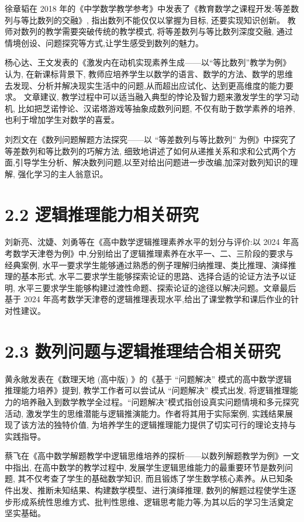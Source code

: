 \documentclass[10pt]{article}
\begin{document}
徐章韬在 2018 年的《中学数学教学参考》中发表了《教育数学之课程开发:等差数列与等比数列的交融》, 指出数列不能仅仅以掌握为目标, 还要实现知识创新。 教师对数列的教学需要突破传统的教学模式, 将等差数列与等比数列深度交融, 通过情境创设、问题探究等方式,让学生感受到数列的魅力。

杨心达、王文发表的《激发内在动机实现素养生成——以“等比数列”教学为例》 认为, 在新课标背景下, 教师应培养学生以数学的语言、数学的方法、数学的思维去发现、分析并解决现实生活中的问题,从而超出应试化、达到更高维度的能力要求。 文章建议, 教学过程中可以适当融入典型的悖论及智力题来激发学生的学习动机, 比如把芝诺悖论、汉诺塔游戏等抽象成数列问题, 不仅有助于数学素养的培养, 也利于增加学生对数学的喜爱。

刘烈文在《数列问题解题方法探究——以 “等差数列与等比数列” 为例》中探究了等差数列和等比数列的巧解方法, 细致地讲述了如何从递推关系和求和公式两个方面,引导学生分析、解决数列问题,以至对给出问题进一步改编,加深对数列知识的理解, 强化学习的主人翁意识。

\section*{2.2 逻辑推理能力相关研究}

刘新亮、沈婕、刘勇等在《高中数学逻辑推理素养水平的划分与评价:以 2024 年高考数学天津卷为例》中,分别给出了逻辑推理素养在水平一、二、三阶段的要求与经典案例, 水平一要求学生能够通过熟悉的例子理解归纳推理、类比推理、演绎推理的基本形式, 水平二要求学生能够探索论证的思路、选择合适的论证方法予以证明, 水平三要求学生能够构建过渡性命题、探索论证的途径以解决问题。文章最后基于 2024 年高考数学天津卷的逻辑推理表现水平,给出了课堂教学和课后作业的针对性建议。

\section*{2.3 数列问题与逻辑推理结合相关研究}

黄永敞发表在《数理天地 (高中版) 》的《基于 “问题解决” 模式的高中数学逻辑推理能力培养》提到, 教学工作者可以尝试从 “问题解决” 模式出发, 将逻辑推理能力的培养融入到数学教学全过程。“问题解决”模式指创设真实问题情境和多元探究活动, 激发学生的思维潜能与逻辑推演能力。作者将其用于实际案例, 实践结果展现了该方法的独特价值, 为培养学生的逻辑推理能力提供了切实可行的理论支持与实践指导。

蔡飞在《高中数学解题教学中逻辑思维培养的探析——以数列解题教学为例》一文中指出, 在高中数学的教学过程中, 发展学生逻辑思维能力的最重要环节是数列问题, 其不仅考查了学生的基础数学知识, 而且锻炼了学生数学核心素养。从已知条件出发、推断未知结果、构建数学模型、进行演绎推理, 数列的解题过程使学生逐步形成系统性思维方式、批判性思维、逻辑思考能力等,为其以后的学习生活奠定坚实基础。
\end{document}
